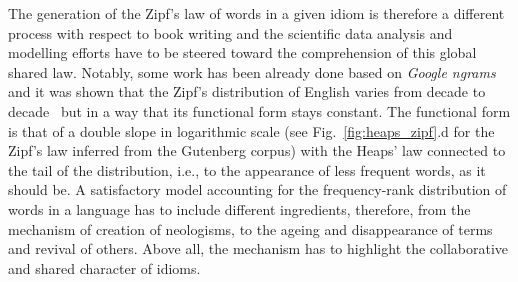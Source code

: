 \documentclass[graybox]{svmult}
\begin{document}
The generation of the Zipf's law of words in a given idiom is therefore a different process with respect to book writing and the scientific data analysis and modelling efforts have to be steered toward the comprehension of this global shared law.
Notably, some work has been already done based on \emph{Google ngrams} and it was shown that the Zipf's distribution of English varies from decade to decade~\cite{altmann2013} but in a way that its functional form stays constant.
The functional form is that of a double slope in logarithmic scale (see Fig.~\ref{fig:heaps_zipf}.d for the Zipf's law inferred from the Gutenberg corpus) with the Heaps' law connected to the tail of the distribution, i.e., to the appearance of less frequent words, as it should be. 
A satisfactory model accounting for the frequency-rank distribution of words in a language has to include different ingredients, therefore, from the mechanism of creation of neologisms, to the ageing and disappearance of terms and revival of others.
Above all, the mechanism has to highlight the collaborative and shared character of idioms.

%
%


\end{document}
